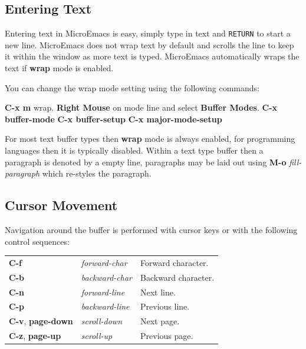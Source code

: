 \documentclass[11pt,a4paper,pdftex]{article}
\begin{document}
\subsection{Entering Text}

  Entering text in MicroEmacs is easy, simply type in text and \texttt{RETURN}
  to start a new line. MicroEmacs does not wrap text by default and scrolls
  the line to keep it within the window as more text is typed. MicroEmacs
  automatically wraps the text if \textbf{wrap} mode is enabled.

  You can change the wrap mode setting using the following commands:

  \textbf{C-x m} wrap.\newline
  \textbf{Right Mouse} on mode line and select \textbf{Buffer Modes}.\newline
  \textbf{C-x buffer-mode}\newline
  \textbf{C-x buffer-setup}
  \textbf{C-x major-mode-setup}

  For most text buffer types then \textbf{wrap} mode is always enabled, for
  programming languages then it is typically disabled. Within a text type
  buffer then a paragraph is denoted by a empty line, paragraphs may be laid
  out using \textbf{M-o} \textit{fill-paragraph} which re-styles the
  paragraph.

\subsection{Cursor Movement}

  Navigation around the buffer is performed with cursor keys or with the
  following control sequences:

  \begin{longtable}{ll@{\ --\ }l}
    \endhead
    \endfoot
    \endlastfoot
    \textbf{C-f} & \textit{forward-char} &
    Forward character.\\
    \textbf{C-b} & \textit{backward-char} &
    Backward character.\\
    \textbf{C-n} & \textit{forward-line} &
    Next line.\\
    \textbf{C-p} & \textit{backward-line} &
    Previous line.\\
    \textbf{C-v}, \textbf{page-down} & \textit{scroll-down} &
    Next page.\\
    \textbf{C-z}, \textbf{page-up} & \textit{scroll-up} &
    Previous page.\\
  \end{longtable}
\end{document}
